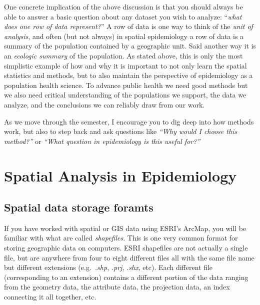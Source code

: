 \documentclass[
]{book}
\begin{document}
One concrete implication of the above discussion is that you should always be able to answer a basic question about any dataset you wish to analyze: ``\emph{what does one row of data represent?}'' A row of data is one way to think of the \emph{unit of analysis}, and often (but not always) in spatial epidemiology a row of data is a summary of the population contained by a geographic unit. Said another way it is an \emph{ecologic summary} of the population. As stated above, this is only the most simplistic example of how and why it is important to not only learn the spatial statistics and methods, but to also maintain the perspective of epidemiology as a population health science. To advance public health we need good methods but we also need critical understanding of the populations we support, the data we analyze, and the conclusions we can reliably draw from our work.

As we move through the semester, I encourage you to dig deep into how methods work, but also to step back and ask questions like \emph{``Why would I choose this method?''} or \emph{``What question in epidemiology is this useful for?''}

\hypertarget{spatial-analysis-in-epidemiology}{%
\section{Spatial Analysis in Epidemiology}\label{spatial-analysis-in-epidemiology}}

\hypertarget{spatial-data-storage-foramts}{%
\subsection{Spatial data storage foramts}\label{spatial-data-storage-foramts}}

If you have worked with spatial or GIS data using ESRI's ArcMap, you will be familiar with what are called \emph{shapefiles}. This is one very common format for storing geographic data on computers. ESRI shapefiles are not actually a single file, but are anywhere from four to eight different files all with the same file name but different extensions (e.g.~\emph{.shp}, \emph{.prj}, \emph{.shx}, etc). Each different file (corresponding to an extension) contains a different portion of the data ranging from the geometry data, the attribute data, the projection data, an index connecting it all together, etc.
\end{document}
